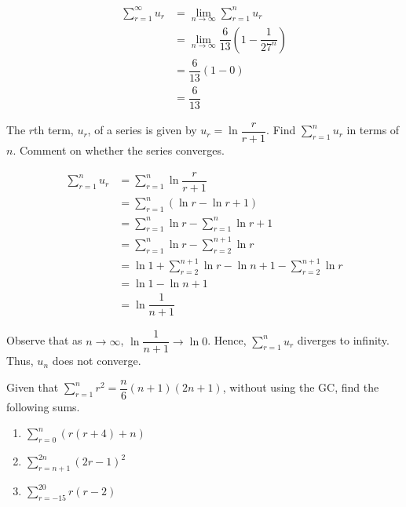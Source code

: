 \documentclass{echw}
\begin{document}

        \begin{align*}
            \sum\limits_{r=1}^\infty u_r &= \lim_{n \to \infty} \sum\limits_{r=1}^n u_r\\
            &= \lim_{n \to \infty} \dfrac{6}{13} \left(1-\dfrac1{27^n}\right)\\
            &= \dfrac{6}{13} (1-0)\\
            &= \dfrac6{13}
        \end{align*}


    \problem{}
        The $r$th term, $u_r$, of a series is given by $u_r = \ln \dfrac{r}{r+1}$. Find $\sum\limits_{r=1}^n u_r$ in terms of $n$. Comment on whether the series converges.

    \solution
        \begin{align*}
            \sum\limits_{r=1}^n u_r &= \sum\limits_{r=1}^n \ln \dfrac{r}{r+1}\\
            &= \sum\limits_{r=1}^n (\ln r - \ln{r+1})\\
            &= \sum\limits_{r=1}^n \ln r - \sum\limits_{r=1}^n\ln{r+1}\\
            &= \sum\limits_{r=1}^n \ln r - \sum\limits_{r=2}^{n+1}\ln r\\
            &= \ln 1 + \sum\limits_{r=2}^{n+1} \ln r - \ln{n+1} - \sum\limits_{r=2}^{n+1}\ln r\\
            &= \ln 1 - \ln{n+1}\\
            &= \ln \dfrac1{n+1}
        \end{align*}


        Observe that as $n \to \infty$, $\ln \dfrac1{n+1} \to \ln 0$. Hence, $\displaystyle\sum\limits_{r=1}^n u_r$ diverges to infinity. Thus, $u_n$ does not converge.

    \problem{}
        Given that $\sum\limits_{r=1}^n r^2 = \dfrac{n}6 (n+1)(2n+1)$, without using the GC, find the following sums.

        \begin{enumerate}
            \item $\displaystyle\sum\limits_{r=0}^n (r(r+4) + n)$
            \item $\displaystyle\sum\limits_{r=n+1}^{2n} (2r-1)^2$
            \item $\displaystyle\sum\limits_{r=-15}^{20} r(r-2)$
        \end{enumerate}
\end{document}

